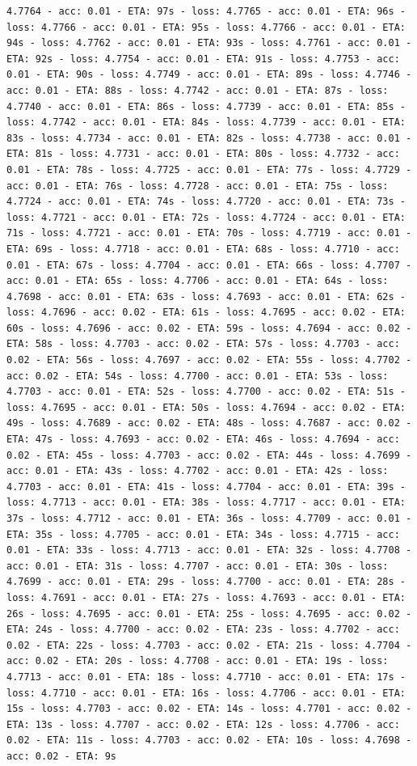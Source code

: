 \documentclass[11pt]{article}
\begin{document}
\begin{Verbatim}[commandchars=\\\{\}]
4.7764 - acc: 0.01 - ETA: 97s - loss: 4.7765 - acc: 0.01 - ETA: 96s - loss: 4.7766 - acc: 0.01 - ETA: 95s - loss: 4.7766 - acc: 0.01 - ETA: 94s - loss: 4.7762 - acc: 0.01 - ETA: 93s - loss: 4.7761 - acc: 0.01 - ETA: 92s - loss: 4.7754 - acc: 0.01 - ETA: 91s - loss: 4.7753 - acc: 0.01 - ETA: 90s - loss: 4.7749 - acc: 0.01 - ETA: 89s - loss: 4.7746 - acc: 0.01 - ETA: 88s - loss: 4.7742 - acc: 0.01 - ETA: 87s - loss: 4.7740 - acc: 0.01 - ETA: 86s - loss: 4.7739 - acc: 0.01 - ETA: 85s - loss: 4.7742 - acc: 0.01 - ETA: 84s - loss: 4.7739 - acc: 0.01 - ETA: 83s - loss: 4.7734 - acc: 0.01 - ETA: 82s - loss: 4.7738 - acc: 0.01 - ETA: 81s - loss: 4.7731 - acc: 0.01 - ETA: 80s - loss: 4.7732 - acc: 0.01 - ETA: 78s - loss: 4.7725 - acc: 0.01 - ETA: 77s - loss: 4.7729 - acc: 0.01 - ETA: 76s - loss: 4.7728 - acc: 0.01 - ETA: 75s - loss: 4.7724 - acc: 0.01 - ETA: 74s - loss: 4.7720 - acc: 0.01 - ETA: 73s - loss: 4.7721 - acc: 0.01 - ETA: 72s - loss: 4.7724 - acc: 0.01 - ETA: 71s - loss: 4.7721 - acc: 0.01 - ETA: 70s - loss: 4.7719 - acc: 0.01 - ETA: 69s - loss: 4.7718 - acc: 0.01 - ETA: 68s - loss: 4.7710 - acc: 0.01 - ETA: 67s - loss: 4.7704 - acc: 0.01 - ETA: 66s - loss: 4.7707 - acc: 0.01 - ETA: 65s - loss: 4.7706 - acc: 0.01 - ETA: 64s - loss: 4.7698 - acc: 0.01 - ETA: 63s - loss: 4.7693 - acc: 0.01 - ETA: 62s - loss: 4.7696 - acc: 0.02 - ETA: 61s - loss: 4.7695 - acc: 0.02 - ETA: 60s - loss: 4.7696 - acc: 0.02 - ETA: 59s - loss: 4.7694 - acc: 0.02 - ETA: 58s - loss: 4.7703 - acc: 0.02 - ETA: 57s - loss: 4.7703 - acc: 0.02 - ETA: 56s - loss: 4.7697 - acc: 0.02 - ETA: 55s - loss: 4.7702 - acc: 0.02 - ETA: 54s - loss: 4.7700 - acc: 0.01 - ETA: 53s - loss: 4.7703 - acc: 0.01 - ETA: 52s - loss: 4.7700 - acc: 0.02 - ETA: 51s - loss: 4.7695 - acc: 0.01 - ETA: 50s - loss: 4.7694 - acc: 0.02 - ETA: 49s - loss: 4.7689 - acc: 0.02 - ETA: 48s - loss: 4.7687 - acc: 0.02 - ETA: 47s - loss: 4.7693 - acc: 0.02 - ETA: 46s - loss: 4.7694 - acc: 0.02 - ETA: 45s - loss: 4.7703 - acc: 0.02 - ETA: 44s - loss: 4.7699 - acc: 0.01 - ETA: 43s - loss: 4.7702 - acc: 0.01 - ETA: 42s - loss: 4.7703 - acc: 0.01 - ETA: 41s - loss: 4.7704 - acc: 0.01 - ETA: 39s - loss: 4.7713 - acc: 0.01 - ETA: 38s - loss: 4.7717 - acc: 0.01 - ETA: 37s - loss: 4.7712 - acc: 0.01 - ETA: 36s - loss: 4.7709 - acc: 0.01 - ETA: 35s - loss: 4.7705 - acc: 0.01 - ETA: 34s - loss: 4.7715 - acc: 0.01 - ETA: 33s - loss: 4.7713 - acc: 0.01 - ETA: 32s - loss: 4.7708 - acc: 0.01 - ETA: 31s - loss: 4.7707 - acc: 0.01 - ETA: 30s - loss: 4.7699 - acc: 0.01 - ETA: 29s - loss: 4.7700 - acc: 0.01 - ETA: 28s - loss: 4.7691 - acc: 0.01 - ETA: 27s - loss: 4.7693 - acc: 0.01 - ETA: 26s - loss: 4.7695 - acc: 0.01 - ETA: 25s - loss: 4.7695 - acc: 0.02 - ETA: 24s - loss: 4.7700 - acc: 0.02 - ETA: 23s - loss: 4.7702 - acc: 0.02 - ETA: 22s - loss: 4.7703 - acc: 0.02 - ETA: 21s - loss: 4.7704 - acc: 0.02 - ETA: 20s - loss: 4.7708 - acc: 0.01 - ETA: 19s - loss: 4.7713 - acc: 0.01 - ETA: 18s - loss: 4.7710 - acc: 0.01 - ETA: 17s - loss: 4.7710 - acc: 0.01 - ETA: 16s - loss: 4.7706 - acc: 0.01 - ETA: 15s - loss: 4.7703 - acc: 0.02 - ETA: 14s - loss: 4.7701 - acc: 0.02 - ETA: 13s - loss: 4.7707 - acc: 0.02 - ETA: 12s - loss: 4.7706 - acc: 0.02 - ETA: 11s - loss: 4.7703 - acc: 0.02 - ETA: 10s - loss: 4.7698 - acc: 0.02 - ETA: 9s 
\end{Verbatim}
\end{document}
